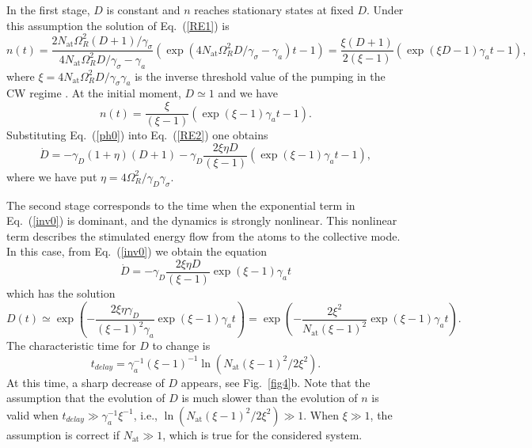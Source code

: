 \documentclass[aps,pra,amsmath,amssymb,onecolumn,superscriptaddress,showpacs,floatfix,]{revtex4-1}
\begin{document}
In the first stage, $D$ is constant and $n$ reaches stationary states at fixed $D$.
Under this assumption the solution of Eq.~(\ref{RE1}) is
\begin{equation} 
n\left( t \right) = \frac{{2{N_{\text{at}}}\Omega _R^2\left( {D + 1} \right)/{\gamma _\sigma }}}{{4{N_{\text{at}}}\Omega _R^2D/{\gamma _\sigma } - {\gamma _a}}}\left( {\exp \left( {4{N_{\text{at}}}\Omega _R^2D/{\gamma _\sigma } - {\gamma _a}} \right)t - 1} \right) = \frac{{\xi \left( {D + 1} \right)}}{{2\left( {\xi-1} \right)}}\left( {\exp \left( {\xi D - 1} \right){\gamma _a}t - 1} \right), \label{ph}
\end{equation}
where $\xi={4{N_{\text{at}}}\Omega _R^2D/{\gamma _\sigma \gamma_a }}$ is the inverse threshold value of the pumping in the CW regime \cite{ScullyQO}.
At the initial moment, $D \simeq 1$ and we have  
\begin{equation} 
n\left( t \right) = \frac{\xi }{{\left( {\xi - 1} \right)}}\left( {\exp \left( {\xi  - 1} \right){\gamma _a}t - 1} \right). \label{ph0}
\end{equation}
Substituting Eq.~(\ref{ph0}) into Eq.~(\ref{RE2}) one obtains
\begin{equation} 
\dot D =  - {\gamma _D}\left( {1 + \eta } \right)\left( {D + 1} \right) - {\gamma _D}\frac{{2\xi \eta D}}{{\left( {\xi  - 1} \right)}}\left( {\exp \left( {\xi  - 1} \right){\gamma _a}t - 1} \right), \label{inv0}
\end{equation}
where we have put $\eta = 4 \Omega_R^2 /\gamma_D \gamma_\sigma$. 

The second stage corresponds to the time when the exponential term in Eq.~(\ref{inv0}) is dominant, and the dynamics is strongly nonlinear.
This nonlinear term describes the stimulated energy flow from the atoms to the collective mode.
In this case, from Eq.~(\ref{inv0}) we obtain the equation
\begin{equation} 
\dot D =  - {\gamma _D}\frac{{2\xi \eta D}}{{\left( {\xi  - 1} \right)}}{\exp \left( {\xi  - 1} \right){\gamma _a}t} \label{invnl1}
\end{equation}
which has the solution
\begin{equation} 
D\left( t \right) \simeq \exp \left( { - \frac{{2\xi \eta {\gamma _D}}}{{{{\left( {\xi  - 1} \right)}^2}{\gamma _a}}}\exp \left( {\xi  - 1} \right){\gamma _a}t} \right) = \exp \left( { - \frac{{2{\xi ^2}}}{{{N_{\text{at}}}{{\left( {\xi  - 1} \right)}^2}}}\exp \left( {\xi  - 1} \right){\gamma _a}t} \right).
\end{equation}
The characteristic time for $D$ to change is 
\begin{equation} 
{t_{delay}} = \gamma _a^{ - 1}{\left( {\xi  - 1} \right)^{ - 1}}\ln \left( {{N_{\text{at}}}{{\left( {\xi  - 1} \right)}^2}/2{\xi ^2}} \right). \label{tdele}
\end{equation}
At this time, a sharp decrease of $D$ appears, see Fig.~\ref{fig4}b.
Note that the assumption that the evolution of $D$ is much slower than the evolution of $n$ is valid when $t_{delay} \gg \gamma_a^{-1} \xi^{-1}$, i.e., $\ln \left( {{N_{\text{at}}}{{\left( {\xi  - 1} \right)}^2}/2{\xi ^2}} \right) \gg 1$.
When $\xi \gg 1$, the assumption is correct if $N_{\text{at}} \gg 1$, which is true for the considered system.
\end{document}
